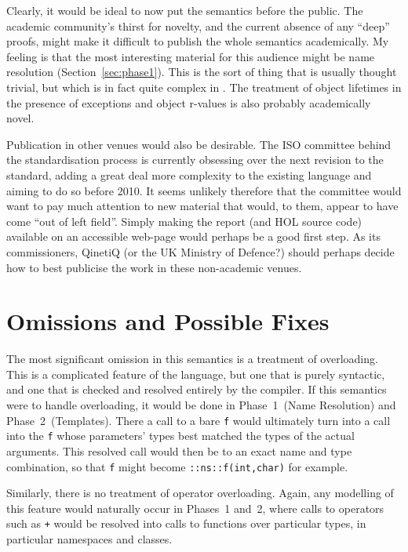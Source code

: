 \documentclass[11pt]{article}
\begin{document}
Clearly, it would be ideal to now put the \cpp{} semantics before the
public.  The academic community's thirst for novelty, and the current
absence of any ``deep'' proofs, might make it difficult to publish the
whole semantics academically.  My feeling is that the most interesting
material for this audience might be name resolution
(Section~\ref{sec:phase1}). This is the sort of thing that is usually
thought trivial, but which is in fact quite complex in \cpp{}.  The
treatment of object lifetimes in the presence of exceptions and object
r-values is also probably academically novel.

Publication in other venues would also be desirable.  The ISO
committee behind the standardisation process is currently obsessing
over the next revision to the standard, adding a great deal more
complexity to the existing language and aiming to do so before 2010.
It seems unlikely therefore that the committee would want to pay much
attention to new material that would, to them, appear to have come
``out of left field''.  Simply making the report (and HOL source code)
available on an accessible web-page would perhaps be a good first
step.  As its commissioners, QinetiQ (or the UK Ministry of Defence?)
should perhaps decide how to best publicise the work in these
non-academic venues.



\section{Omissions and Possible Fixes}
\label{sec:omissions}

 The most significant omission in this semantics is
a treatment of overloading.  This is a complicated feature of the
language, but one that is purely syntactic, and one that is checked
and resolved entirely by the compiler.  If this semantics were to
handle overloading, it would be done in Phase~1~(Name Resolution) and
Phase~2~(Templates).  There a call to a bare \texttt{f} would
ultimately turn into a call into the \texttt{f} whose parameters'
types best matched the types of the actual arguments.  This resolved
call would then be to an exact name and type combination, so that
\texttt{f} might become \texttt{::ns::f(int,char)} for example.

Similarly, there is no treatment of operator overloading.  Again, any
modelling of this feature would naturally occur in Phases~1 and~2,
where calls to operators such as \texttt{+} would be resolved into
calls to functions over particular types, in particular namespaces and
classes.
\end{document}
